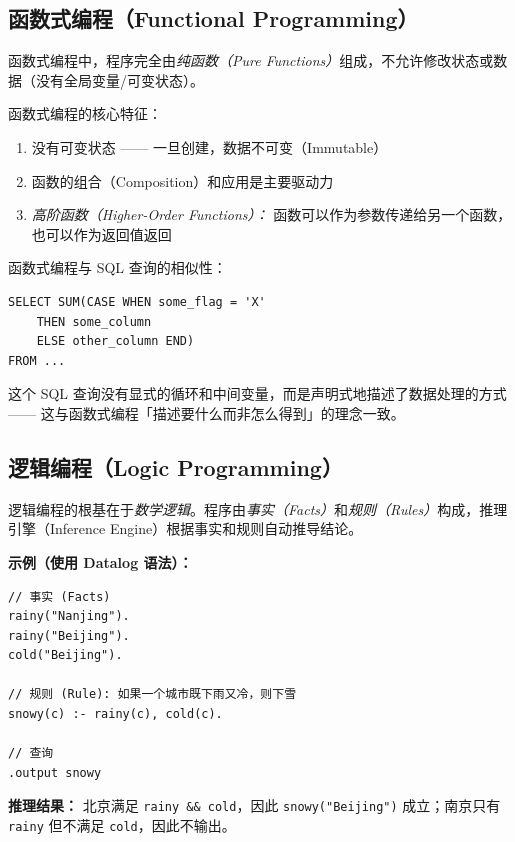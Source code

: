 \documentclass[12pt,a4paper]{ctexart}
\begin{document}
\subsection{函数式编程（Functional Programming）}

\begin{keybox}
  函数式编程中，程序完全由\emph{纯函数（Pure Functions）}组成，不允许修改状态或数据（没有全局变量/可变状态）。
\end{keybox}

函数式编程的核心特征：
\begin{enumerate}[itemsep=0.2em]
  \item 没有可变状态 —— 一旦创建，数据不可变（Immutable）
  \item 函数的组合（Composition）和应用是主要驱动力
  \item \emph{高阶函数（Higher-Order Functions）：} 函数可以作为参数传递给另一个函数，也可以作为返回值返回
\end{enumerate}

\begin{notebox}
  函数式编程与 SQL 查询的相似性：
  \begin{lstlisting}
SELECT SUM(CASE WHEN some_flag = 'X'
    THEN some_column
    ELSE other_column END)
FROM ...
  \end{lstlisting}
  这个 SQL 查询没有显式的循环和中间变量，而是声明式地描述了数据处理的方式 —— 这与函数式编程「描述要什么而非怎么得到」的理念一致。
\end{notebox}

\subsection{逻辑编程（Logic Programming）}

\begin{keybox}
  逻辑编程的根基在于\emph{数学逻辑}。程序由\emph{事实（Facts）}和\emph{规则（Rules）}构成，推理引擎（Inference Engine）根据事实和规则自动推导结论。
\end{keybox}

\textbf{示例（使用 Datalog 语法）：}

\begin{lstlisting}
// 事实 (Facts)
rainy("Nanjing").
rainy("Beijing").
cold("Beijing").

// 规则 (Rule): 如果一个城市既下雨又冷，则下雪
snowy(c) :- rainy(c), cold(c).

// 查询
.output snowy
\end{lstlisting}

\textbf{推理结果：} 北京满足 \texttt{rainy \&\& cold}，因此 \texttt{snowy("Beijing")} 成立；南京只有 \texttt{rainy} 但不满足 \texttt{cold}，因此不输出。
\end{document}

